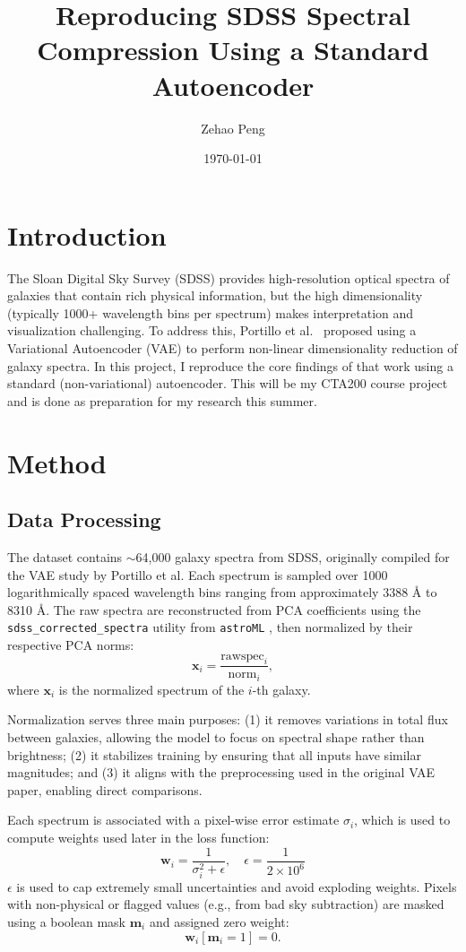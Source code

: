 \documentclass[11pt]{article}
\title{Reproducing SDSS Spectral Compression Using a Standard Autoencoder}
\author{Zehao Peng}
\date{\today}
\begin{document}
\maketitle

\section{Introduction}
The Sloan Digital Sky Survey (SDSS) provides high-resolution optical spectra of galaxies that contain rich physical information, but the high dimensionality (typically 1000+ wavelength bins per spectrum) makes interpretation and visualization challenging. To address this, Portillo et al.\ \citep{Portillo2020} proposed using a Variational Autoencoder (VAE) to perform non-linear dimensionality reduction of galaxy spectra. In this project, I reproduce the core findings of that work using a standard (non-variational) autoencoder. This will be my CTA200 course project and is done as preparation for my research this summer. 

\section{Method}
\subsection{Data Processing}
The dataset contains $\sim$64,000 galaxy spectra from SDSS, originally compiled for the VAE study by Portillo et al. Each spectrum is sampled over 1000 logarithmically spaced wavelength bins ranging from approximately 3388 \AA{} to 8310 \AA{}. The raw spectra are reconstructed from PCA coefficients using the \texttt{sdss\_corrected\_spectra} utility from \texttt{astroML} \citep{VanderPlas2012}, then normalized by their respective PCA norms:
\begin{equation}
\mathbf{x}_i = \frac{\text{rawspec}_i}{\text{norm}_i},
\end{equation}
where $\mathbf{x}_i$ is the normalized spectrum of the $i$-th galaxy.

Normalization serves three main purposes: (1) it removes variations in total flux between galaxies, allowing the model to focus on spectral shape rather than brightness; (2) it stabilizes training by ensuring that all inputs have similar magnitudes; and (3) it aligns with the preprocessing used in the original VAE paper, enabling direct comparisons.

Each spectrum is associated with a pixel-wise error estimate $\sigma_i$, which is used to compute weights used later in the loss function:
\begin{equation}
\mathbf{w}_i = \frac{1}{\sigma_i^2 + \epsilon}, \quad \epsilon = \frac{1}{2 \times 10^6}
\end{equation}
$\epsilon$ is used to cap extremely small uncertainties and avoid exploding weights. Pixels with non-physical or flagged values (e.g., from bad sky subtraction) are masked using a boolean mask $\mathbf{m}_i$ and assigned zero weight:
\begin{equation}
\mathbf{w}_i[\mathbf{m}_i = 1] = 0.
\end{equation}
\end{document}
